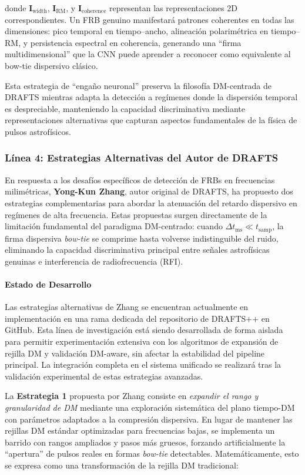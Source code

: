donde $\mathbf{I}_{\mathrm{width}}$, $\mathbf{I}_{\mathrm{RM}}$, y $\mathbf{I}_{\mathrm{coherence}}$ representan las representaciones 2D correspondientes. Un FRB genuino manifestará patrones coherentes en todas las dimensiones: pico temporal en tiempo–ancho, alineación polarimétrica en tiempo–RM, y persistencia espectral en coherencia, generando una ``firma multidimensional'' que la CNN puede aprender a reconocer como equivalente al bow-tie dispersivo clásico.

Esta estrategia de ``engaño neuronal'' preserva la filosofía DM-centrada de DRAFTS mientras adapta la detección a regímenes donde la dispersión temporal es despreciable, manteniendo la capacidad discriminativa mediante representaciones alternativas que capturan aspectos fundamentales de la física de pulsos astrofísicos.

\subsubsection{Línea 4: Estrategias Alternativas del Autor de DRAFTS}

En respuesta a los desafíos específicos de detección de FRBs en frecuencias milimétricas, \textbf{Yong-Kun Zhang}, autor original de DRAFTS, ha propuesto dos estrategias complementarias para abordar la atenuación del retardo dispersivo en regímenes de alta frecuencia. Estas propuestas surgen directamente de la limitación fundamental del paradigma DM-centrado: cuando $\Delta t_{\mathrm{ms}} \ll t_{\mathrm{samp}}$, la firma dispersiva \textit{bow-tie} se comprime hasta volverse indistinguible del ruido, eliminando la capacidad discriminativa principal entre señales astrofísicas genuinas e interferencia de radiofrecuencia (RFI).

\paragraph{Estado de Desarrollo}

Las estrategias alternativas de Zhang se encuentran actualmente en implementación en una rama dedicada del repositorio de DRAFTS++ en GitHub. Esta línea de investigación está siendo desarrollada de forma aislada para permitir experimentación extensiva con los algoritmos de expansión de rejilla DM y validación DM-aware, sin afectar la estabilidad del pipeline principal. La integración completa en el sistema unificado se realizará tras la validación experimental de estas estrategias avanzadas.

La \textbf{Estrategia 1} propuesta por Zhang consiste en \textit{expandir el rango y granularidad de DM} mediante una exploración sistemática del plano tiempo-DM con parámetros adaptados a la compresión dispersiva. En lugar de mantener las rejillas DM estándar optimizadas para frecuencias bajas, se implementa un barrido con rangos ampliados y pasos más gruesos, forzando artificialmente la ``apertura'' de pulsos reales en formas \textit{bow-tie} detectables. Matemáticamente, esto se expresa como una transformación de la rejilla DM tradicional:

